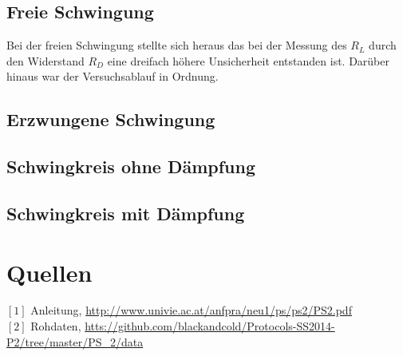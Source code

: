 \documentclass[12pt,a4paper]{article}
\begin{document}
\begin{multicols}{2}
\subsection{Freie Schwingung}
Bei der freien Schwingung stellte sich heraus das bei der Messung des $R_L$ durch den Widerstand $R_D$ eine dreifach höhere Unsicherheit entstanden ist. Darüber hinaus war der Versuchsablauf in Ordnung. 

\subsection{Erzwungene Schwingung}
\subsection{Schwingkreis ohne Dämpfung}
\subsection{Schwingkreis mit Dämpfung}


\section{Quellen}
$[1]$ Anleitung, \url{http://www.univie.ac.at/anfpra/neu1/ps/ps2/PS2.pdf}\\
$[2]$ Rohdaten, \url{htts://github.com/blackandcold/Protocols-SS2014-P2/tree/master/PS_2/data}\\

\end{multicols}
\end{document}
